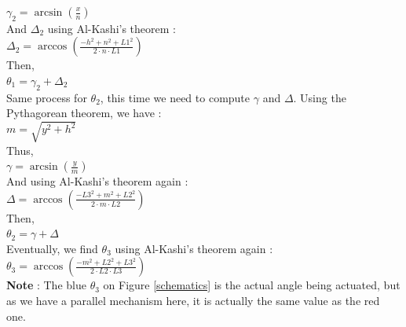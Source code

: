 \documentclass[12pt,fleqn,leqno,letterpaper]{article}
\begin{document}
\noindent $\gamma_{2} = \arcsin(\frac{x}{n})$\\

\noindent And $\Delta_{2}$ using Al-Kashi's theorem : \\

\noindent $\Delta_{2} = \arccos(\frac{-h^2 + n^2 + L1^2}{2 \cdot n \cdot L1})$\\

\noindent Then, \\

\noindent $\boxed{\theta_{1} = \gamma_{2} + \Delta_{2}}$\\

\noindent Same process for $\theta_{2}$, this time we need to compute $\gamma$ and $\Delta$. Using the Pythagorean theorem, we have : \\

\noindent $m = \sqrt{y^2 + h^2}$\\

\noindent Thus,\\

\noindent $\gamma = \arcsin(\frac{y}{m})$\\

\noindent And using Al-Kashi's theorem again : \\

\noindent $\Delta = \arccos(\frac{-L3^2 + m^2 + L2^2}{2 \cdot m \cdot L2})$\\

\noindent Then, \\

\noindent $\boxed{\theta_{2} = \gamma + \Delta}$\\

\noindent Eventually, we find $\theta_{3}$ using Al-Kashi's theorem again : \\

\noindent $\boxed{\theta_{3} = \arccos(\frac{-m^2 + L2^2 + L3^2}{2 \cdot L2 \cdot L3})}$\\

\noindent \textbf{Note} : The blue $\theta_{3}$ on Figure \ref{schematics} is the actual angle being actuated, but as we have a parallel mechanism here, it is actually the same value as the red one.
\end{document}
